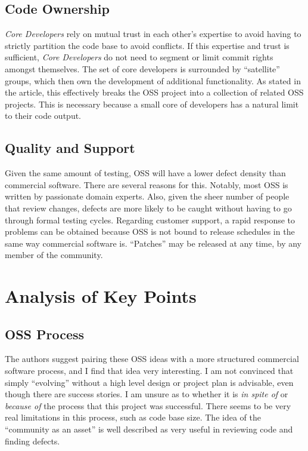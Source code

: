 \documentclass{article}
\begin{document}
\subsection{Code Ownership} {\it Core Developers} rely on mutual trust in each other's expertise to avoid having to strictly partition the code base to avoid conflicts. If this expertise and trust is sufficient, {\it Core Developers} do not need to segment or limit commit rights amongst themselves. The set of core developers is surrounded by ``satellite'' groups, which then own the development of additional functionality. As stated in the article, this effectively breaks the OSS project into a collection of related OSS projects. This is necessary because a small core of developers has a natural limit to their code output.

\subsection{Quality and Support} Given the same amount of testing, OSS will have a lower defect density than commercial software. There are several reasons for this. Notably, most OSS is written by passionate domain experts. Also, given the sheer number of people that review changes, defects are more likely to be caught without having to go through formal testing cycles. Regarding customer support, a rapid response to problems can be obtained because OSS is not bound to release schedules in the same way commercial software is. ``Patches'' may be released at any time, by any member of the community.

\section{Analysis of Key Points}

\subsection{OSS Process}
The authors suggest pairing these OSS ideas with a more structured commercial software process, and I find that idea very interesting. I am not convinced that simply ``evolving'' without a high level design or project plan is advisable, even though there are success stories. I am unsure as to whether it is {\it in spite of} or {\it because of} the process that this project was successful. There seems to be very real limitations in this process, such as code base size. The idea of the ``community as an asset'' is well described as very useful in reviewing code and finding defects.
\end{document}
